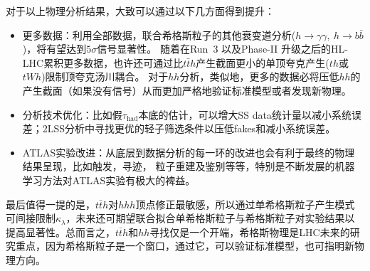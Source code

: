 对于以上物理分析结果，大致可以通过以下几方面得到提升：
\begin{itemize}
 \item 更多数据：利用全部\RunTwo 数据，联合希格斯粒子的其他衰变道分析($h\rightarrow \gamma\gamma,~h\rightarrow b\bar{b}$)，将有望达到$5\sigma$信号显著性。
随着在Run~3 以及Phase-II 升级之后的HL-LHC累积更多数据，也许还可通过比$t\bar{t}h$产生截面更小的单顶夸克产生($th$或$tWh$)限制顶夸克汤川耦合。
对于$hh$分析，类似地，更多的数据必将压低$hh$的产生截面（如果没有信号）从而更加严格地验证标准模型或者发现新物理。
 \item 分析技术优化：比如假$\tau_{\text{had}}$本底的估计，可以增大SS data统计量以减小系统误差；2LSS分析中寻找更优的轻子筛选条件以压低fakes和减小系统误差。
 \item ATLAS实验改进：从底层到数据分析的每一环的改进也会有利于最终的物理结果呈现，比如触发，寻迹，
粒子重建及鉴别等等，特别是不断发展的机器学习方法对ATLAS实验有极大的裨益。
\end{itemize}

最后值得一提的是，$t\bar{t}h$对$hhh$顶点修正最敏感\cite{Maltoni:2017ims}，所以通过单希格斯粒子产生模式可间接限制$\kappa_{\lambda}$，未来还可期望联合拟合单希格斯粒子与希格斯粒子对实验结果以
提高显著性。总而言之，$t\bar{t}h$和$hh$寻找仅是一个开端，希格斯物理是LHC未来的研究重点，因为希格斯粒子是一个窗口，通过它，可以验证标准模型，也可指明新物理方向。
